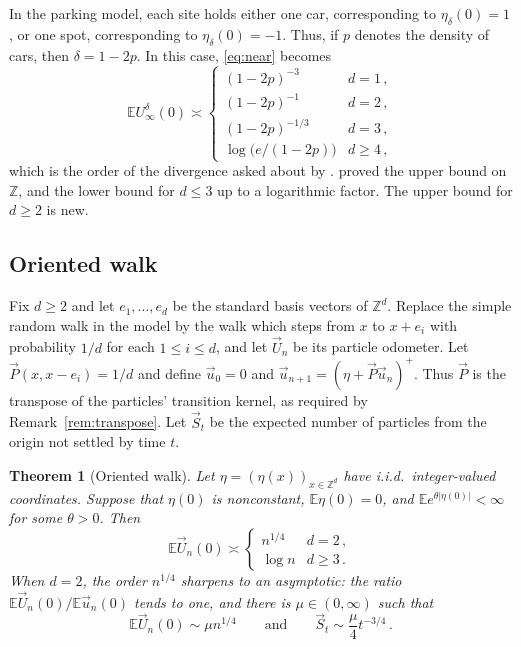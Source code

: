 \documentclass[11pt]{amsart}
\theoremstyle{plain}
\newtheorem{theorem}{Theorem}[section]
\theoremstyle{definition}
\newcommand{\Z}{\mathbb{Z}}
\newcommand{\E}{\mathbb{E}}
\begin{document}
In the parking model, each site holds either one car, corresponding to $\eta_\delta(0)=1$, or one spot, corresponding to $\eta_\delta(0)=-1$. Thus, if $p$ denotes the density of cars, then $\delta=1-2p$. In this case, \eqref{eq:near} becomes
\[
	\E U_\infty^\delta(0)\asymp
	\begin{cases}
		(1-2p)^{-3}&d=1\,,\\
		(1-2p)^{-1}&d=2\,,\\
		(1-2p)^{-1/3}&d=3\,,\\
			\log\bigl(e/(1-2p)\bigr)&d\geq4\,,
	\end{cases}
\]
which is the order of the divergence asked about by
\citet[Open Question~2]{DGJLS}. \citet{JJLS} proved the upper bound on $\Z$, and the
lower bound for $d\leq3$ up to a logarithmic factor. The upper bound
	for $d\geq2$ is new.

\subsection{Oriented walk}\label{ssec:results-oriented}

Fix $d\geq2$ and let $e_1,\ldots,e_d$ be the standard basis vectors of $\Z^d$.
Replace the simple random walk in the model by the walk which steps from $x$ to
$x+e_i$ with probability $1/d$ for each $1\leq i\leq d$, and let $\vec U_n$ be
its particle odometer. Let $\vec P(x,x-e_i)=1/d$ and define
$\vec u_0=0$ and $\vec u_{n+1}=(\eta+\vec P\vec u_n)^+$. Thus $\vec P$ is the
transpose of the particles' transition kernel, as required by
Remark~\ref{rem:transpose}. Let $\vec S_t$ be the expected number of particles
from the origin not settled by time $t$.

\begin{theorem}[Oriented walk]\label{thm:oriented-walk}
	Let $\eta=(\eta(x))_{x\in\Z^d}$ have i.i.d.\ integer-valued coordinates.
	Suppose that $\eta(0)$ is nonconstant, $\E\eta(0)=0$, and
	$\E e^{\theta|\eta(0)|}<\infty$ for some $\theta>0$. Then
	\[
		\E \vec U_n(0)\asymp
		\begin{cases}
			n^{1/4}&d=2\,,\\
			\log n&d\geq3\,.
		\end{cases}
	\]
	When $d=2$, the order $n^{1/4}$ sharpens to an asymptotic: the ratio $\E \vec U_n(0)/\E \vec u_n(0)$ tends to one, and there is $\mu\in(0,\infty)$ such that
	\[
		\E \vec U_n(0)\sim\mu n^{1/4}
		\qquad\text{and}\qquad
		\vec S_t\sim\frac{\mu}{4}t^{-3/4}\,.
	\]
\end{theorem}
\end{document}
